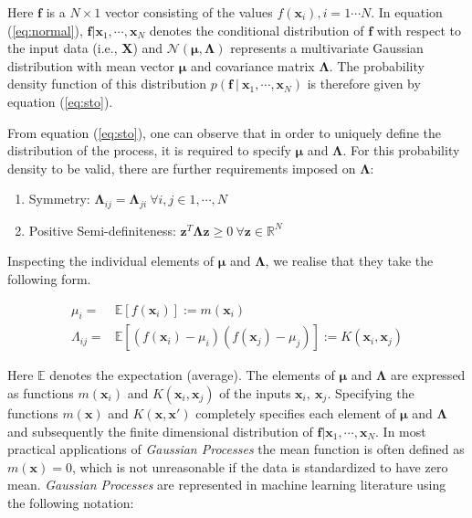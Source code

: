 \documentclass[sw, draft]{AGUTeX}
\begin{document}
\begin{article}
Here $\mathbf{f}$ is a $N\times 1$ vector consisting of the values $f(\mathbf{x}_i), i = 1 \cdots N$. In equation (\ref{eq:normal}), $\mathbf{f}|\mathbf{x}_1, \cdots, \mathbf{x}_N$ denotes the conditional distribution of $\mathbf{f}$ with respect to the input data (i.e., $\mathbf{X}$) and $\mathcal{N}\left( \mathbf{\mu}, \mathbf{\Lambda} \right)$ represents a multivariate Gaussian distribution with mean vector $\mathbf{\mu}$ and covariance matrix $\mathbf{\Lambda}$. The probability density function of this distribution $p( \mathbf{f} \ | \ \mathbf{x}_1, \cdots, \mathbf{x}_N)$ is therefore given by equation (\ref{eq:sto}).

From equation (\ref{eq:sto}), one can observe that in order to uniquely define the distribution of the process, it is required to specify $\mathbf{\mu}$ and $\mathbf{\Lambda}$. For this probability density to be valid, there are further requirements imposed on $\mathbf{\Lambda}$: 

\begin{enumerate}
      \item Symmetry: $\mathbf{\Lambda}_{ij} = \mathbf{\Lambda}_{ji} \ \forall i,j \in {1, \cdots, N} $ 
      \item Positive Semi-definiteness: $\mathbf{z}^T \mathbf{\Lambda} \mathbf{z} \geq 0 \ \forall \mathbf{z} \in \mathbb{R}^N$  
\end{enumerate}

Inspecting the individual elements of $\mathbf{\mu}$ and $\mathbf{\Lambda}$, we realise that they take the following form.

\begin{align}
      \mu_i = & \mathbb{E}[f(\mathbf{x}_i)] := m(\mathbf{x}_i) \\
      \Lambda_{ij} = & \mathbb{E}[(f(\mathbf{x}_i) - \mu_i)(f(\mathbf{x}_j) - \mu_j)] := K(\mathbf{x}_i, \mathbf{x}_j)
\end{align}

Here $\mathbb{E}$ denotes the expectation (average). The elements of $\mathbf{\mu}$ and $\mathbf{\Lambda}$ are expressed as functions $m(\mathbf{x}_i)$ and $K(\mathbf{x}_i, \mathbf{x}_j)$ of the inputs $\mathbf{x}_i,\ \mathbf{x}_j$. Specifying the functions $m(\mathbf{x})$ and $K(\mathbf{x}, \mathbf{x}')$ completely specifies each element of $\mathbf{\mu}$ and $\mathbf{\Lambda}$ and subsequently the finite dimensional distribution of $\mathbf{f} | \mathbf{x}_1, \cdots, \mathbf{x}_N $. In most practical applications of \emph{Gaussian Processes} the mean function is often defined as $m(\mathbf{x}) = 0$, which is not unreasonable if the data is standardized to have zero mean. \emph{Gaussian Processes} are represented in machine learning literature using the following notation:


\end{article}
\end{document}
